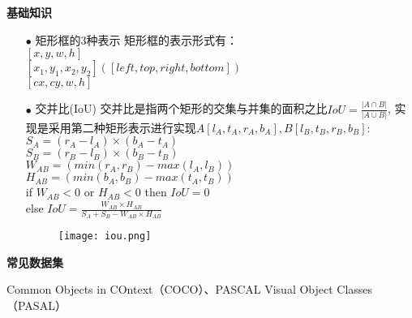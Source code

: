 \begin{frame}
    \noindent\large\textbf{基础知识}
    \begin{itemize}
        \item[$ \bullet $] 矩形框的3种表示
            矩形框的表示形式有：\\
            $[x,y,w,h]$ \\
            $[x_1,y_1,x_2,y_2]([left,top,right,bottom])$\\
            $[cx,cy,w,h]$
        \item[$ \bullet $] 交并比(IoU)
            交并比是指两个矩形的交集与并集的面积之比$IoU=\frac{|A\cap B|}{|A\cup B|}$,
            实现是采用第二种矩形表示进行实现$A[l_A,t_A,r_A,b_A],B[l_B,t_B,r_B,b_B]$:\\
            $S_A=(r_A-l_A)\times(b_A-t_A)$\\
            $S_B=(r_B-l_B)\times(b_B-t_B)$\\
            $W_{AB}=(min(r_A,r_B)-max(l_A,l_B))$\\
            $H_{AB}=(min(b_A,b_B)-max(t_A,t_B))$\\
            if $ W_{AB}<0$ or $H_{AB}<0$ then $IoU = 0$\\
            else $IoU=\frac{W_{AB}\times H_{AB}}{S_A+S_B-W_{AB}\times H_{AB}}$
            \vspace{-3.5cm}
            \begin{figure}
                \hspace{6cm}
                \texttt{[image: iou.png]}
            \end{figure}

    \end{itemize}
\end{frame}


\begin{frame}
    \noindent\large\textbf{常见数据集}


    \vspace{1em} \small
    Common Objects in COntext（COCO）、PASCAL Visual Object Classes（PASAL）
\end{frame}



